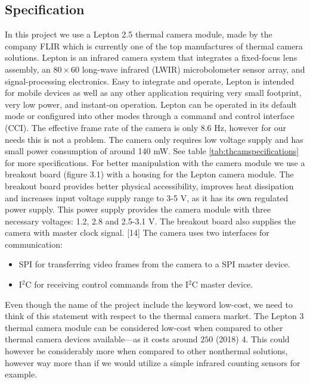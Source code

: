 \subsection{Specification}
\label{ssec:}
In this project we use a Lepton 2.5 thermal camera module, made by the company
FLIR which is currently one of the top manufactures of thermal camera solutions.
Lepton is an infrared camera system that integrates a fixed-focus lens assembly,
an $80 \times 60$ long-wave infrared (LWIR) microbolometer sensor array, and
signal-processing electronics. Easy to integrate and operate, Lepton is intended
for mobile devices as well as any other application requiring very small
footprint, very low power, and instant-on operation. Lepton can be operated in
its default mode or configured into other modes through a command and control
interface (CCI). The effective frame rate of the camera is only 8.6 \si{\hertz},
however for our needs this is not a problem. The camera only requires low
voltage supply and has small power consumption of around 140 \si{\milli\watt}.
See table \ref{tab:thcamspecifications} for more specifications. For better
manipulation with the camera module we use a breakout board (figure 3.1) with a
housing for the Lepton camera module. The breakout board provides better
physical accessibility, improves heat dissipation and increases input voltage
supply range to 3-5 \si{\volt}, as it has its own regulated power supply. This
power supply provides the camera module with three necessary voltages: 1.2, 2.8
and 2.5-3.1 \si{\volt}. The breakout board also supplies the camera with master
clock signal. [14] The camera uses two interfaces for communication:
\begin{itemize}
    \item SPI for transferring video frames from the camera to a SPI master
device.
    \item I$^{2}$C for receiving control commands from the I$^{2}$C master
device.
\end{itemize}
Even though the name of the project include the keyword low-cost, we need to
think of this statement with respect to the thermal camera market. The Lepton 3
thermal camera module can be considered low-cost when compared to other thermal
camera devices available—as it costs around $250$ (2018) 4. This could however
be considerably more when compared to other nonthermal solutions, however way
more than if we would utilize a simple infrared counting sensors for example.
%
